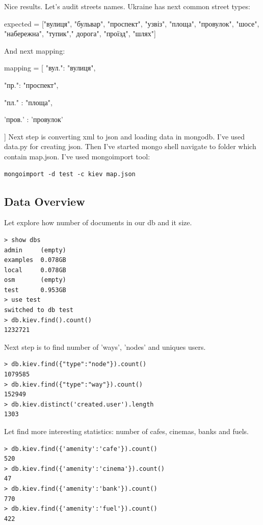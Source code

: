 \documentclass[a4paper,12pt]{article}
\begin{document}
Nice results. Let's audit streets names. Ukraine has next common street types:\par
expected = ["\foreignlanguage{russian}{вулиця}",  "\foreignlanguage{russian}{бульвар}", "\foreignlanguage{russian}{проспект}", "\foreignlanguage{russian}{узвіз}", "\foreignlanguage{russian}{площа}", "\foreignlanguage{russian}{провулок}", "\foreignlanguage{russian}{шосе}", "\foreignlanguage{russian}{набережна}", "\foreignlanguage{russian}{тупик}"," \foreignlanguage{russian}{дорога}", "\foreignlanguage{russian}{проїзд}", "\foreignlanguage{russian}{шлях}"]\par
And next mapping:\par
mapping = [ "\foreignlanguage{russian}{вул.}": "\foreignlanguage{russian}{вулиця}",\par
            "\foreignlanguage{russian}{пр}.": "\foreignlanguage{russian}{проспект}",\par
            "\foreignlanguage{russian}{пл.}" : "\foreignlanguage{russian}{площа}",\par
            '\foreignlanguage{russian}{пров.}' : '\foreignlanguage{russian}{провулок}'\par
]
Next step is converting xml to json and loading data in mongodb. I've used data.py for creating json. Then I've started mongo shell navigate to folder which contain map.json. I've used mongoimport tool:
\begin{lstlisting}[style=DOS]
 mongoimport -d test -c kiev map.json
\end{lstlisting}
\subsection*{Data Overview}
Let explore how number of documents in our db and it size.
\begin{lstlisting}[caption={Size and number of documents in db.},style=DOS]
> show dbs
admin     (empty)
examples  0.078GB
local     0.078GB
osm       (empty)
test      0.953GB
> use test
switched to db test
> db.kiev.find().count()
1232721
\end{lstlisting}
Next step is to find number of 'ways', 'nodes' and uniques users.
\begin{lstlisting}[style=DOS,caption={Basic statistics}]
> db.kiev.find({"type":"node"}).count()
1079585
> db.kiev.find({"type":"way"}).count()
152949
> db.kiev.distinct('created.user').length
1303
\end{lstlisting}

Let find more interesting statistics: number of cafes, cinemas, banks and fuels.
\begin{lstlisting}[style=DOS]
> db.kiev.find({'amenity':'cafe'}).count()
520
> db.kiev.find({'amenity':'cinema'}).count()
47
> db.kiev.find({'amenity':'bank'}).count()
770
> db.kiev.find({'amenity':'fuel'}).count()
422
\end{lstlisting}
\end{document}

